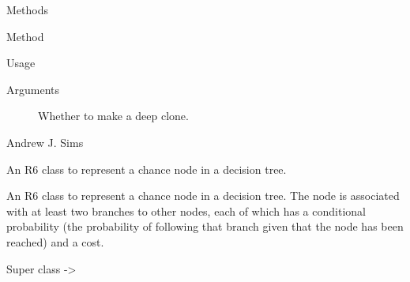 \documentclass[a4paper]{book}
\begin{document}
\begin{Section}{Methods}
\begin{SubSection}{Method }
\begin{SubSubSection}{Usage}
\end{SubSubSection}


%
\begin{SubSubSection}{Arguments}

\begin{description}

\item[] Whether to make a deep clone.

\end{description}


\end{SubSubSection}

\end{SubSection}

\end{Section}
%
\begin{Author}\relax
Andrew J. Sims 
\end{Author}
%
\begin{Description}\relax
An R6 class to represent a chance node in a decision tree.
\end{Description}
%
\begin{Details}\relax
An R6 class to represent a chance node in a decision tree. 
The node is associated with at least two branches to other nodes, each 
of which has a conditional probability (the probability of following
that branch given that the node has been reached) and a cost.
\end{Details}
%
\begin{Section}{Super class}
 -> 
\end{Section}
%
\end{document}
